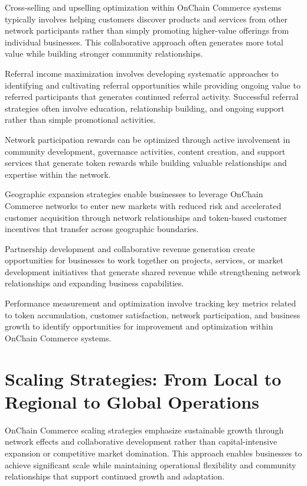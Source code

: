 \documentclass[
  Letterpaper,
]{scrbook}
\begin{document}
Cross-selling and upselling optimization within OnChain Commerce systems
typically involves helping customers discover products and services from
other network participants rather than simply promoting higher-value
offerings from individual businesses. This collaborative approach often
generates more total value while building stronger community
relationships.

Referral income maximization involves developing systematic approaches
to identifying and cultivating referral opportunities while providing
ongoing value to referred participants that generates continued referral
activity. Successful referral strategies often involve education,
relationship building, and ongoing support rather than simple
promotional activities.

Network participation rewards can be optimized through active
involvement in community development, governance activities, content
creation, and support services that generate token rewards while
building valuable relationships and expertise within the network.

Geographic expansion strategies enable businesses to leverage OnChain
Commerce networks to enter new markets with reduced risk and accelerated
customer acquisition through network relationships and token-based
customer incentives that transfer across geographic boundaries.

Partnership development and collaborative revenue generation create
opportunities for businesses to work together on projects, services, or
market development initiatives that generate shared revenue while
strengthening network relationships and expanding business capabilities.

Performance measurement and optimization involve tracking key metrics
related to token accumulation, customer satisfaction, network
participation, and business growth to identify opportunities for
improvement and optimization within OnChain Commerce systems.

\section{Scaling Strategies: From Local to Regional to Global
Operations}\label{scaling-strategies-from-local-to-regional-to-global-operations}

OnChain Commerce scaling strategies emphasize sustainable growth through
network effects and collaborative development rather than
capital-intensive expansion or competitive market domination. This
approach enables businesses to achieve significant scale while
maintaining operational flexibility and community relationships that
support continued growth and adaptation.
\end{document}
